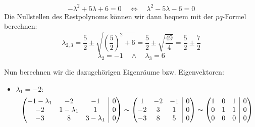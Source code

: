 \documentclass[answers]{exam}
\makeatletter
\newenvironment{sysmatrix}[1]
  {\left(\begin{array}{@{}#1@{}}}
  {\end{array}\right)}
\makeatother
\begin{document}
\begin{questions}
\begin{solution}
        $$
            -\lambda^2 + 5\lambda + 6 = 0 \quad \iff \quad \lambda^2 - 5\lambda - 6 = 0
        $$
        Die Nullstellen des Restpolynoms können wir dann bequem mit der $pq$-Formel berechnen:
        $$
            \lambda_{2, 3} = \frac{5}{2} \pm \sqrt{\left(\frac{5}{2}\right)^2 + 6} = \frac{5}{2} \pm \sqrt{\frac{49}{4}} = \frac{5}{2} \pm \frac{7}{2}
        $$
        $$
            \lambda_2 = -1 \quad \land \quad \lambda_3 = 6
        $$

        \newpage
        Nun berechnen wir die dazugehörigen Eigenräume bzw. Eigenvektoren:
        \begin{itemize}
            \item $\lambda_1 = -2:$
                  $$
                      \begin{sysmatrix}{ccc|c}
                          -1 - \lambda_1 & -2 & -1 & 0 \\
                          -2 & 1 - \lambda_1 & 1 & 0 \\
                          -3 & 8 & 3 - \lambda_1 & 0
                      \end{sysmatrix}
                      \sim
                      \begin{sysmatrix}{ccc|c}
                          1 & -2 & -1 & 0 \\
                          -2 & 3 & 1 & 0 \\
                          -3 & 8 & 5 & 0
                      \end{sysmatrix}
                      \sim
                      \begin{sysmatrix}{ccc|c}
                          1 & 0 & 1 & 0 \\
                          0 & 1 & 1 & 0 \\
                          0 & 0 & 0 & 0
                      \end{sysmatrix}
                  $$


\end{itemize}
\end{solution}
\end{questions}
\end{document}
